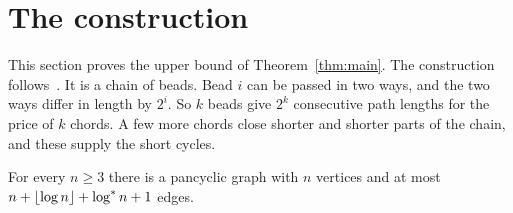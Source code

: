 \section{The construction}\label{sec:upper}

This section proves the upper bound of Theorem~\ref{thm:main}. The construction follows~\cite{KNT}.
It is a chain of beads. Bead $i$ can be passed in two ways, and the two ways differ in length by
$2^{i}$. So $k$ beads give $2^{k}$ consecutive path lengths for the price of $k$ chords. A few more
chords close shorter and shorter parts of the chain, and these supply the short cycles.

\begin{proposition}\label{prop:upper}
For every $n\ge3$ there is a pancyclic graph with $n$ vertices and at most
$n+\lfloor\log n\rfloor+\log^{*} n+1$ edges.
\end{proposition}

